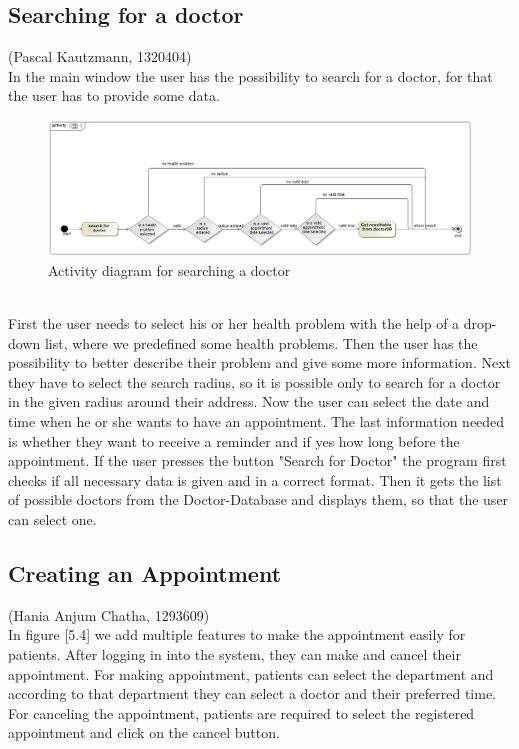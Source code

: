 \documentclass[a4paper, 12pt]{report}
\begin{document}
\subsection{Searching for a doctor}
{\tiny (Pascal Kautzmann, 1320404)\\}
In the main window the user has the possibility to search for a doctor, for that the user has to provide some data.
\begin{figure}[!h]
\includegraphics[width=\linewidth]{doctorsearch.jpg} 
\caption{Activity diagram for searching a doctor}
\end{figure}
\\First the user needs to select his or her health problem with the help of a drop-down list, where we predefined some health problems.
Then the user has the possibility to better describe their problem and give some more information.
Next they have to select the search radius, so it is possible only to search for a doctor in the given radius around their address.
Now the user can select the date and time when he or she wants to have an appointment.
The last information needed is whether they want to receive a reminder and if yes how long before the appointment.
If the user presses the button "Search for Doctor" the program first checks if all necessary data is given and in a correct format. Then it gets the list of possible doctors from the Doctor-Database and displays them, so that the user can select one.


\subsection{Creating an Appointment}
{\tiny (Hania Anjum Chatha, 1293609)\\}
In figure [5.4] we add multiple features to make the appointment easily for patients. After logging in into the system, they can make and cancel their appointment. For making appointment, patients can select the department and according to that department they can select a doctor and their preferred time. For canceling the appointment, patients are required to select the registered appointment and click on the cancel button.
\end{document}
